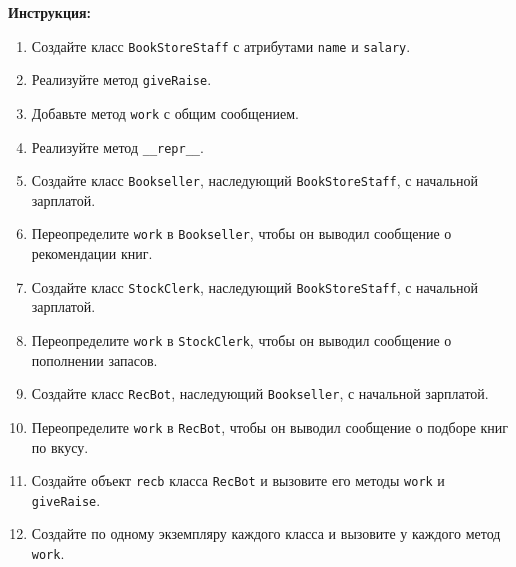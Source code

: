 \begin{enumerate}
\textbf{Инструкция:}
\begin{enumerate}
    \item Создайте класс \texttt{BookStoreStaff} с атрибутами \texttt{name} и \texttt{salary}.
    \item Реализуйте метод \texttt{giveRaise}.
    \item Добавьте метод \texttt{work} с общим сообщением.
    \item Реализуйте метод \texttt{\_\_repr\_\_}.
    \item Создайте класс \texttt{Bookseller}, наследующий \texttt{BookStoreStaff}, с начальной зарплатой.
    \item Переопределите \texttt{work} в \texttt{Bookseller}, чтобы он выводил сообщение о рекомендации книг.
    \item Создайте класс \texttt{StockClerk}, наследующий \texttt{BookStoreStaff}, с начальной зарплатой.
    \item Переопределите \texttt{work} в \texttt{StockClerk}, чтобы он выводил сообщение о пополнении запасов.
    \item Создайте класс \texttt{RecBot}, наследующий \texttt{Bookseller}, с начальной зарплатой.
    \item Переопределите \texttt{work} в \texttt{RecBot}, чтобы он выводил сообщение о подборе книг по вкусу.
    \item Создайте объект \texttt{recb} класса \texttt{RecBot} и вызовите его методы \texttt{work} и \texttt{giveRaise}.
    \item Создайте по одному экземпляру каждого класса и вызовите у каждого метод \texttt{work}.
\end{enumerate}
\end{enumerate}
